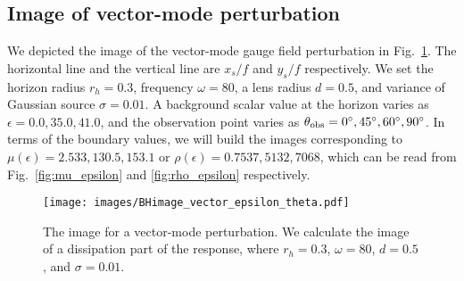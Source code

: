 \documentclass[a4paper,11pt]{article}
\begin{document}
\subsection{Image of vector-mode perturbation}


    We depicted the image of the vector-mode gauge field perturbation in Fig.~\ref{fig:BHimage_vector_Im}. 
    The horizontal line and the vertical line are $x_s/f$ and $y_s/f$ respectively. We set the horizon radius $r_h=0.3$, frequency $\omega=80$, a lens radius $d=0.5$, and  variance of Gaussian source $\sigma=0.01$. 
    A background scalar value at the horizon varies as $\epsilon=0.0, 35.0, 41.0$, and the observation point varies as $\theta_{\rm{obs}}=0^\circ, 45^\circ, 60^\circ,90^\circ$. 
    In terms of the boundary values, we will build the images corresponding to $\mu(\epsilon)=2.533, 130.5, 153.1$ or $\rho(\epsilon)=0.7537, 5132, 7068$, which can be read from Fig.~\ref{fig:mu_epsilon} and \ref{fig:rho_epsilon} respectively.

\begin{figure}
    \centering
    \texttt{[image: images/BHimage\_vector\_epsilon\_theta.pdf]}
    \caption{The image for a vector-mode perturbation. We calculate the image of a dissipation part of the response, where $r_h=0.3$, $\omega=80$, $d=0.5$, and $\sigma=0.01$.}
    \label{fig:BHimage_vector_Im}
\end{figure}
\end{document}

